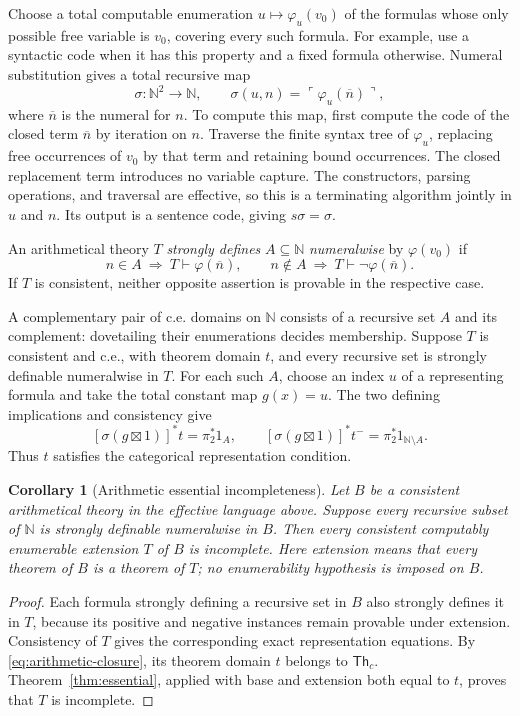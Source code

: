 \documentclass[11pt]{article}
\newtheorem{corollary}[theorem]{Corollary}
\theoremstyle{definition}
\newcommand{\Th}{\mathsf{Th}}
\begin{document}
Choose a total computable enumeration $u\mapsto\varphi_u(v_0)$ of the
formulas whose only possible free variable is $v_0$, covering every such
formula. For example, use a syntactic code when it has this property and a
fixed formula otherwise. Numeral substitution gives a total recursive map
\[
 \sigma:\mathbb N^2\longrightarrow\mathbb N,
 \qquad \sigma(u,n)=\ulcorner\varphi_u(\overline n)\urcorner,
\]
where $\overline n$ is the numeral for $n$. To compute this map, first compute
the code of the closed term $\overline n$ by iteration on $n$. Traverse the
finite syntax tree of $\varphi_u$, replacing free occurrences of $v_0$ by
that term and retaining bound occurrences. The closed replacement term
introduces no variable capture. The constructors, parsing operations, and
traversal are effective, so this is a terminating algorithm jointly in $u$
and $n$. Its output is a sentence code, giving $s\sigma=\sigma$.

An arithmetical theory $T$ \emph{strongly defines} $A\subseteq\mathbb N$
\emph{numeralwise} by $\varphi(v_0)$ if
\[
 n\in A\ \Longrightarrow\ T\vdash\varphi(\overline n),
 \qquad
 n\notin A\ \Longrightarrow\ T\vdash\neg\varphi(\overline n).
\]
If $T$ is consistent, neither opposite assertion is provable in the
respective case.

A complementary pair of c.e. domains on $\mathbb N$ consists of a recursive
set $A$ and its complement: dovetailing their enumerations decides
membership. Suppose $T$ is consistent and c.e., with theorem domain $t$,
and every recursive set is strongly definable numeralwise in $T$. For each
such $A$, choose an index $u$ of a representing formula and take the total
constant map $g(x)=u$. The two defining implications and consistency give
\[
 [\sigma(g\boxtimes1)]^*t=\pi_2^*1_A,
 \qquad
 [\sigma(g\boxtimes1)]^*t^-=\pi_2^*1_{\mathbb N\setminus A}.
\]
Thus $t$ satisfies the categorical representation condition.

\begin{corollary}[Arithmetic essential incompleteness]\label{cor:arithmetic}
Let $B$ be a consistent arithmetical theory in the effective language above.
Suppose every recursive subset of $\mathbb N$ is strongly definable
numeralwise in $B$. Then every consistent computably enumerable extension
$T$ of $B$ is incomplete. Here extension means that every theorem of $B$
is a theorem of $T$; no enumerability hypothesis is imposed on $B$.
\end{corollary}
\begin{proof}
Each formula strongly defining a recursive set in $B$ also strongly defines
it in $T$, because its positive and negative instances remain provable
under extension.
Consistency of $T$ gives the corresponding exact representation equations.
By \eqref{eq:arithmetic-closure}, its theorem domain $t$ belongs to $\Th_c$.
Theorem~\ref{thm:essential}, applied with base and extension both equal to
$t$, proves that $T$ is incomplete.
\end{proof}
\end{document}
